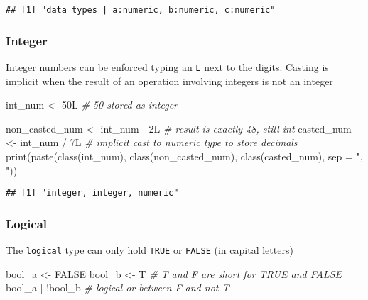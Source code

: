 \documentclass[
  oneside]{book}
\newenvironment{Shaded}{\begin{snugshade}}{\end{snugshade}}
\newcommand{\AttributeTok}[1]{\textcolor[rgb]{0.77,0.63,0.00}{#1}}
\newcommand{\CommentTok}[1]{\textcolor[rgb]{0.56,0.35,0.01}{\textit{#1}}}
\newcommand{\ConstantTok}[1]{\textcolor[rgb]{0.00,0.00,0.00}{#1}}
\newcommand{\FunctionTok}[1]{\textcolor[rgb]{0.00,0.00,0.00}{#1}}
\newcommand{\NormalTok}[1]{#1}
\newcommand{\OtherTok}[1]{\textcolor[rgb]{0.56,0.35,0.01}{#1}}
\newcommand{\SpecialCharTok}[1]{\textcolor[rgb]{0.00,0.00,0.00}{#1}}
\newcommand{\StringTok}[1]{\textcolor[rgb]{0.31,0.60,0.02}{#1}}
\begin{document}
\begin{verbatim}
## [1] "data types | a:numeric, b:numeric, c:numeric"
\end{verbatim}

\hypertarget{integer}{%
\subsubsection{Integer}\label{integer}}

Integer numbers can be enforced typing an \texttt{L} next to the digits.
Casting is implicit when the result of an operation involving integers
is not an integer

\begin{Shaded}
\begin{Highlighting}[]
\NormalTok{int\_num }\OtherTok{\textless{}{-}}\NormalTok{ 50L }\CommentTok{\# 50 stored as integer}

\NormalTok{non\_casted\_num }\OtherTok{\textless{}{-}}\NormalTok{ int\_num }\SpecialCharTok{{-}}\NormalTok{ 2L }\CommentTok{\# result is exactly 48, still int}
\NormalTok{casted\_num }\OtherTok{\textless{}{-}}\NormalTok{ int\_num }\SpecialCharTok{/}\NormalTok{ 7L }\CommentTok{\# implicit cast to numeric type to store decimals}
\FunctionTok{print}\NormalTok{(}\FunctionTok{paste}\NormalTok{(}\FunctionTok{class}\NormalTok{(int\_num), }\FunctionTok{class}\NormalTok{(non\_casted\_num),}
            \FunctionTok{class}\NormalTok{(casted\_num), }\AttributeTok{sep =} \StringTok{", "}\NormalTok{))}
\end{Highlighting}
\end{Shaded}

\begin{verbatim}
## [1] "integer, integer, numeric"
\end{verbatim}

\hypertarget{logical}{%
\subsubsection{Logical}\label{logical}}

The \texttt{logical} type can only hold \texttt{TRUE} or \texttt{FALSE} (in capital letters)

\begin{Shaded}
\begin{Highlighting}[]
\NormalTok{bool\_a }\OtherTok{\textless{}{-}} \ConstantTok{FALSE}
\NormalTok{bool\_b }\OtherTok{\textless{}{-}}\NormalTok{ T }\CommentTok{\# T and F are short for TRUE and FALSE}
\NormalTok{bool\_a }\SpecialCharTok{|} \SpecialCharTok{!}\NormalTok{bool\_b }\CommentTok{\# logical or between F and not{-}T}
\end{Highlighting}
\end{Shaded}
\end{document}
